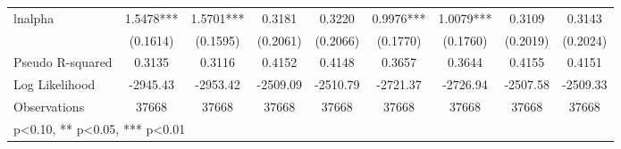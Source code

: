 \begin{table}[htbp]
\begin{tabular}{l*{8}{c}}
lnalpha             &      1.5478***&      1.5701***&      0.3181   &      0.3220   &      0.9976***&      1.0079***&      0.3109   &      0.3143   \\
                    &    (0.1614)   &    (0.1595)   &    (0.2061)   &    (0.2066)   &    (0.1770)   &    (0.1760)   &    (0.2019)   &    (0.2024)   \\
\hline
Pseudo R-squared    &      0.3135   &      0.3116   &      0.4152   &      0.4148   &      0.3657   &      0.3644   &      0.4155   &      0.4151   \\
Log Likelihood      &    -2945.43   &    -2953.42   &    -2509.09   &    -2510.79   &    -2721.37   &    -2726.94   &    -2507.58   &    -2509.33   \\
Observations        &       37668   &       37668   &       37668   &       37668   &       37668   &       37668   &       37668   &       37668   \\
\hline\hline
\multicolumn{9}{l}{\footnotesize * p<0.10, ** p<0.05, *** p<0.01}\\
\end{tabular}
\end{table}
